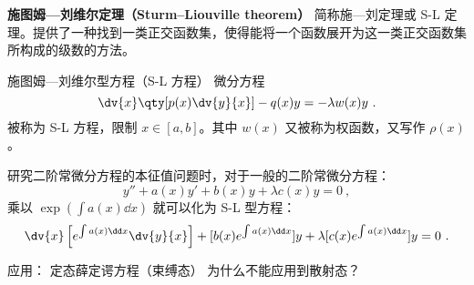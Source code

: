 
\begin{issues}
\issueDraft
\end{issues}





\textbf{施图姆—刘维尔定理（Sturm–Liouville theorem）} 简称施—刘定理或 S-L 定理。提供了一种找到一类正交函数集，使得能将一个函数展开为这一类正交函数集所构成的级数的方法。

\begin{definition}{施图姆—刘维尔型方程（S-L 方程）}
微分方程
\begin{equation}
\dv{x}\qty[p(x)\dv{y}{x}] - q(x) y = -\lambda w(x) y~.
\end{equation}
被称为 S-L 方程，限制 $x \in [a, b]$。其中 $w(x)$ 又被称为权函数，又写作 $\rho(x)$。
\end{definition}




研究二阶常微分方程的本征值问题时，对于一般的二阶常微分方程：
$$y'' + a(x) y' +b(x) y + \lambda c(x) y = 0 ~,$$
乘以 $\exp(\int a(x) \dd x)$ 就可以化为 S-L 型方程：
$$\dv{x} \left[e^{\int a(x) \dd x} \dv{y}{x}\right]  + [b(x) e^{\int a(x) \dd x}]y +\lambda[c(x) e^{\int a(x) \dd x}] y = 0~.$$

 
应用： 定态薛定谔方程（束缚态） 为什么不能应用到散射态？
